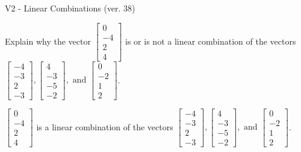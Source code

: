 \begin{exercise}
  \begin{exerciseTitle}V2 - Linear Combinations (ver. 38)\end{exerciseTitle}
  \begin{exerciseStatement}
    Explain why the vector \(\left[\begin{array}{c}
0 \\
-4 \\
2 \\
4
\end{array}\right]\)  is or is not a linear 
	combination of the vectors \(\left[\begin{array}{c}
-4 \\
-3 \\
2 \\
-3
\end{array}\right] , \left[\begin{array}{c}
4 \\
-3 \\
-5 \\
-2
\end{array}\right] , \text{ and } \left[\begin{array}{c}
0 \\
-2 \\
1 \\
2
\end{array}\right]\).
	


  \end{exerciseStatement}
  \begin{exerciseAnswer}
   \(\left[\begin{array}{c}
0 \\
-4 \\
2 \\
4
\end{array}\right]\) 
  	 is  
	a linear combination of the vectors \(\left[\begin{array}{c}
-4 \\
-3 \\
2 \\
-3
\end{array}\right] , \left[\begin{array}{c}
4 \\
-3 \\
-5 \\
-2
\end{array}\right] , \text{ and } \left[\begin{array}{c}
0 \\
-2 \\
1 \\
2
\end{array}\right]\).

	
  


  \end{exerciseAnswer}
\end{exercise}